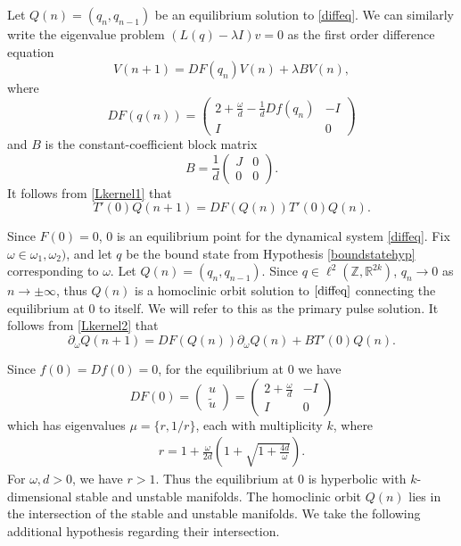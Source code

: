 \documentclass[12pt]{article}
\def\R{{\mathbb R}}
\def\Z{{\mathbb Z}}
\begin{document}
Let $Q(n) = (q_n, q_{n-1})$ be an equilibrium solution to \eqref{diffeq}. We can similarly write the eigenvalue problem $(L(q) - \lambda I)v = 0$ as the first order difference equation 
\begin{equation}\label{latticeEVP}
V(n+1) = DF(q_n) V(n) + \lambda B V(n),
\end{equation}
where
\begin{equation}\label{latticeDF}
DF(q(n)) = 
\begin{pmatrix}
2 + \frac{\omega}{d} - \frac{1}{d}Df(q_n) & -I  \\
I & 0
\end{pmatrix} 
\end{equation}
and $B$ is the constant-coefficient block matrix
\begin{equation}\label{latticeB}
B = \frac{1}{d} 
\begin{pmatrix}
J & 0 \\
0 & 0 
\end{pmatrix}.
\end{equation}
It follows from \eqref{Lkernel1} that
\begin{equation}\label{DFkernel1}
T'(0) Q(n+1) = DF(Q(n)) T'(0) Q(n).
\end{equation}

Since $F(0) = 0$, 0 is an equilibrium point for the dynamical system \eqref{diffeq}. Fix $\omega \in \omega_1, \omega_2)$, and let $q$ be the bound state from Hypothesis \ref{boundstatehyp} corresponding to $\omega$. Let $Q(n) = ( q_n, q_{n-1} )$. Since $q \in \ell^2(\Z, \R^{2k})$, $q_n \rightarrow 0$ as $n \rightarrow \pm \infty$, thus $Q(n)$ is a homoclinic orbit solution to $\eqref{diffeq}$ connecting the equilibrium at 0 to itself. We will refer to this as the primary pulse solution. It follows from \eqref{Lkernel2} that
\begin{equation}\label{DFkernel2}
\partial_\omega Q(n+1) = DF(Q(n)) \partial_\omega Q(n) + B T'(0)Q(n).
\end{equation}

Since $f(0) = Df(0) = 0$, for the equilibrium at 0 we have
\begin{equation}\label{DF0}
DF(0) = \begin{pmatrix}u \\ \tilde{u} \end{pmatrix} =
\begin{pmatrix}
2 + \frac{\omega}{d} & -I  \\
I & 0
\end{pmatrix} 
\end{equation}
which has eigenvalues $\mu = \{r, 1/r\}$, each with multiplicity $k$, where
\begin{align}\label{eigr}
r = 1 + \frac{\omega}{2 d} \left( 1 + \sqrt{1 + \frac{4 d}{\omega}} \right).
\end{align}
For $\omega, d > 0$, we have $r > 1$. Thus the equilibrium at 0 is hyperbolic with $k$-dimensional stable and unstable manifolds. The homoclinic orbit $Q(n)$ lies in the intersection of the stable and unstable manifolds. We take the following additional hypothesis regarding their intersection.
\end{document}
